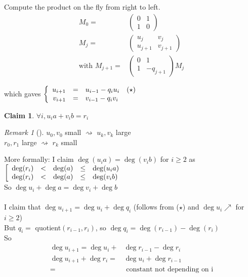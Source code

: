 \documentclass{article}
\newtheorem{claim}{Claim}
\theoremstyle{definition}
\theoremstyle{remark}
\newtheorem*{remark}{Remark}
\newcommand{\Rem}[3]{\begin{remark}[#1]\label{#2}#3\end{remark}}
\begin{document}
\begin{itemize}
Compute the product on the fly from right to left.\\
\begin{align*}
M_0 = & \begin{pmatrix}
0 & 1\\ 1 & 0
\end{pmatrix}\\
M_j = & \begin{pmatrix}
u_j & v_j\\ u_{j+1} & v_{j+1}
\end{pmatrix}\\
\text{with } M_{j+1} = & \begin{pmatrix}
0 & 1\\ 1 & -q_{j+1}
\end{pmatrix}
M_j
\end{align*}

which gaves $\left\{\begin{array}{r c l r}
u_{i+1} & = & u_{i-1} - q_iu_i & (\star)\\
v_{i+1} & = & v_{i-1} - q_iv_i
\end{array}\right .$
\end{itemize}

\begin{claim}
	$\forall i, u_ia+v_ib=r_i$
\end{claim}
\Rem{}{}{$u_0,v_0$ small $\rightsquigarrow$ $u_k,v_k$ large\\
	$r_0,r_1$ large $\rightsquigarrow$ $r_k$ small}

More formally: I claim $\deg(u_ia) = \deg(v_ib)$ for $i\geq 2$ as $\left[\begin{array}{r c c cl}
\deg(r_i) & < & \deg(a) & \leq & \deg(u_ia)\\
\deg(r_i) & < & \deg(a) & \leq & \deg(v_ib)
\end{array}\right.$\\
So $\deg u_i + \deg a = \deg v_i + \deg b$\\\\
I claim that $\deg u_{i+1} = \deg u_i + \deg q_i$ (follows from ($\star$) and $\deg u_i \nearrow$ for $i \geq 2$)\\
But $q_i =$ quotient$(r_{i-1},r_i)$, so $\deg q_i = \deg(r_{i-1}) - \deg(r_i)$\\
So \begin{align*}
	\deg u_{i+1} = \deg u_i + & \deg r_{i-1} - \deg r_i\\
	\deg u_{i+1} + \deg r_i = & \deg u_i + \deg r_{i-1}\\
	= & \text{ constant not depending on i}
\end{align*}
 
\end{document}
